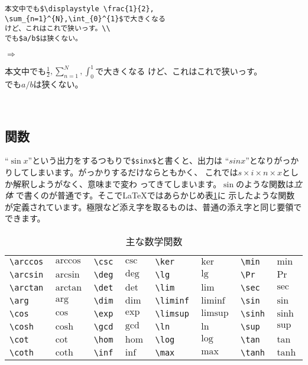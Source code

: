 \begin{minipage}[c]{.50\textwidth}
\begin{screen}
\small
\begin{verbatim}
本文中でも$\displaystyle \frac{1}{2},
\sum_{n=1}^{N},\int_{0}^{1}$で大きくなる
けど、これはこれで狭いっす。\\
でも$a/b$は狭くない。
\end{verbatim}
\end{screen}
\end{minipage}%
$\Rightarrow$
\begin{minipage}{.45\textwidth}
\begin{shadebox}
本文中でも$\displaystyle \frac{1}{2},
\sum_{n=1}^{N},\int_{0}^{1}$で大きくなる
けど、これはこれで狭いっす。\\
でも$a/b$は狭くない。
\end{shadebox}
\end{minipage}
\vspace*{1mm}\\

\subsection{関数}
``$\sin x$''という出力をするつもりで\verb+$sinx$+と書くと、出力は
``$sinx$''となりがっかりしてしまいます。がっかりするだけならともかく、
これでは$s\times i\times n \times x$としか解釈しようがなく、意味まで変わ
ってきてしまいます。$\sin$のような関数は\emph{立体}
で書くのが普通です。そこで{\LaTeX}ではあらかじめ表\ref{tab:function}に
示したような関数が定義されています。極限など添え字を取るものは、普通の添え字と同じ要領でできます。\\
\begin{table}[htbp]
\begin{center}
\caption{主な数学関数}
\label{tab:function}
\begin{tabular}{ll|ll|ll|ll}
 \verb|\arccos| & $\arccos$ & \verb|\csc| & $\csc$ & \verb|\ker|    & $\ker$    & \verb|\min|  & $\min$  \\
 \verb|\arcsin| & $\arcsin$ & \verb|\deg| & $\deg$ & \verb|\lg|     & $\lg$     & \verb|\Pr|   & $\Pr$   \\
 \verb|\arctan| & $\arctan$ & \verb|\det| & $\det$ & \verb|\lim|    & $\lim$    & \verb|\sec|  & $\sec$  \\
 \verb|\arg|    & $\arg$    & \verb|\dim| & $\dim$ & \verb|\liminf| & $\liminf$ & \verb|\sin|  & $\sin$  \\
 \verb|\cos|    & $\cos$    & \verb|\exp| & $\exp$ & \verb|\limsup| & $\limsup$ & \verb|\sinh| & $\sinh$ \\
 \verb|\cosh|   & $\cosh$   & \verb|\gcd| & $\gcd$ & \verb|\ln|     & $\ln$     & \verb|\sup|  & $\sup$  \\
 \verb|\cot|    & $\cot$    & \verb|\hom| & $\hom$ & \verb|\log|    & $\log$    & \verb|\tan|  & $\tan$  \\
 \verb|\coth|   & $\coth$   & \verb|\inf| & $\inf$ & \verb|\max|    & $\max$    & \verb|\tanh| & $\tanh$
\end{tabular}
\end{center}
\end{table}

